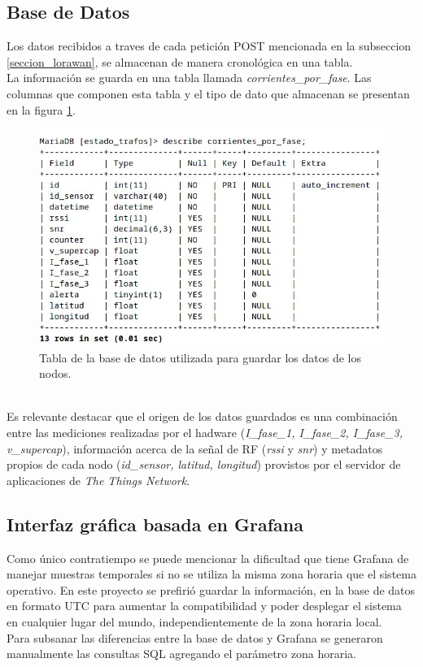\subsection{Base de Datos}
Los datos recibidos a traves de cada petición POST mencionada en la subseccion \ref{seccion_lorawan}, se almacenan de manera cronológica en una tabla.\\
La información se guarda en una tabla llamada \textit{corrientes\_por\_fase}. Las columnas que componen esta tabla y el tipo de dato que almacenan se presentan en la figura \ref{fig:tablacorrientesporfase}.\\
\begin{figure}[h]
	\centering
	\includegraphics[width=1.0\linewidth]{Figures/tabla_corrientes_por_fase}
	\caption{Tabla de la base de datos utilizada para guardar los datos de los nodos.}
	\label{fig:tablacorrientesporfase}
\end{figure}\\
Es relevante destacar que el origen de los datos guardados es una combinación entre las mediciones realizadas por el hadware (\textit{I\_fase\_1, I\_fase\_2, I\_fase\_3, v\_supercap}), información acerca de la señal de RF (\textit{rssi} y \textit{snr}) y metadatos propios de cada nodo (\textit{id\_sensor, latitud, longitud}) provistos por el servidor de aplicaciones de \textit{The Things Network}.\\

\subsection{Interfaz gráfica basada en Grafana}
Como único contratiempo se puede mencionar la dificultad que tiene Grafana de manejar muestras temporales si no se utiliza la misma zona horaria que el sistema operativo. En este proyecto se prefirió guardar la información, en la base de datos en formato UTC para aumentar la compatibilidad y poder desplegar el sistema en cualquier lugar del mundo, independientemente de la zona horaria local.\\
Para subsanar las diferencias entre la base de datos y Grafana se generaron manualmente las consultas SQL agregando el parámetro zona horaria.